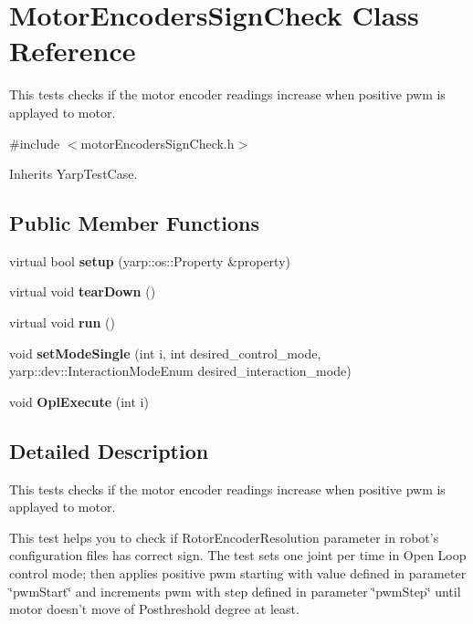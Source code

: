 \section{Motor\-Encoders\-Sign\-Check Class Reference}
\label{classMotorEncodersSignCheck}


This tests checks if the motor encoder readings increase when positive pwm is applayed to motor.  




{\ttfamily \#include $<$motor\-Encoders\-Sign\-Check.\-h$>$}



Inherits Yarp\-Test\-Case.

\subsection*{Public Member Functions}
\begin{DoxyCompactItemize}
\item 
virtual bool {\bfseries setup} (yarp\-::os\-::\-Property \&property)\label{classMotorEncodersSignCheck_a9473c20f3efe4b8fc2c554b6d12f65f9}

\item 
virtual void {\bfseries tear\-Down} ()\label{classMotorEncodersSignCheck_a706ce3dbc1073c90b2981ed55286a407}

\item 
virtual void {\bfseries run} ()\label{classMotorEncodersSignCheck_ac1bb7e6d1b55c9e97c2432dd78f0c625}

\item 
void {\bfseries set\-Mode\-Single} (int i, int desired\-\_\-control\-\_\-mode, yarp\-::dev\-::\-Interaction\-Mode\-Enum desired\-\_\-interaction\-\_\-mode)\label{classMotorEncodersSignCheck_adc3e407539e8368936eed1749dc69317}

\item 
void {\bfseries Opl\-Execute} (int i)\label{classMotorEncodersSignCheck_aeb8969c7334373e30d409de1a4efb429}

\end{DoxyCompactItemize}


\subsection{Detailed Description}
This tests checks if the motor encoder readings increase when positive pwm is applayed to motor. 

This test helps you to check if Rotor\-Encoder\-Resolution parameter in robot's configuration files has correct sign. The test sets one joint per time in Open Loop control mode; then applies positive pwm starting with value defined in parameter \char`\"{}pwm\-Start\char`\"{} and increments pwm with step defined in parameter \char`\"{}pwm\-Step\char`\"{} until motor doesn't move of Posthreshold degree at least.

